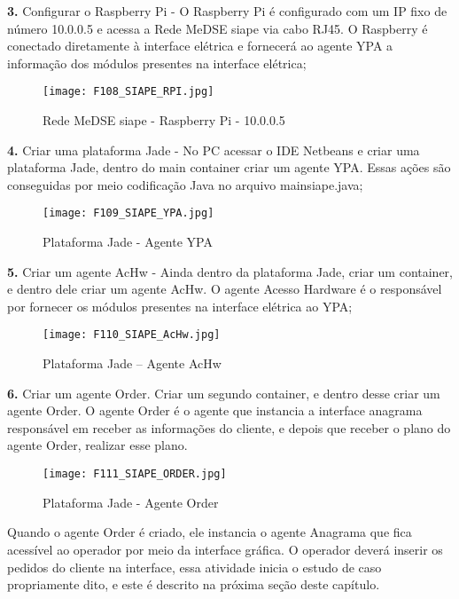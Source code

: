 		\textbf{3.} Configurar o Raspberry Pi -
			O Raspberry Pi é configurado com um IP fixo de número 10.0.0.5 e acessa a Rede MeDSE siape via cabo RJ45. O Raspberry é conectado diretamente à interface elétrica e fornecerá ao agente YPA a informação dos módulos presentes na interface  elétrica;
			
			
				\begin{figure}[!h]
					\centering
					\texttt{[image: F108\_SIAPE\_RPI.jpg]} 
					\caption{Rede MeDSE siape - Raspberry Pi - 10.0.0.5}
					\label{F108}
				\end{figure}
			
			
		\textbf{4.} Criar uma plataforma Jade -
			No PC acessar o IDE Netbeans e criar uma plataforma Jade, dentro do main container criar um agente YPA. Essas ações são conseguidas por meio codificação Java no arquivo mainsiape.java;
			
				\begin{figure}[!h]
					\centering
					\texttt{[image: F109\_SIAPE\_YPA.jpg]} 
					\caption{Plataforma Jade - Agente YPA}
					\label{F109}
				\end{figure}
			
			
	\textbf{5.} Criar um agente AcHw -
			Ainda dentro da plataforma Jade, criar um container, e dentro dele criar um agente AcHw. O agente Acesso Hardware é o responsável por fornecer os módulos presentes na interface elétrica ao YPA; 
			
				\begin{figure}[!h]
					\centering
					\texttt{[image: F110\_SIAPE\_AcHw.jpg]} 
					\caption{Plataforma Jade -- Agente AcHw}
					\label{F110}
				\end{figure}
			
		\textbf{6.} Criar um agente Order.
			Criar um segundo container, e dentro desse criar um agente Order. O agente Order é o agente que instancia a interface anagrama responsável em receber as informações do cliente, e depois que receber o plano do agente Order, realizar esse plano.
			
				\begin{figure}[!h]
					\centering
					\texttt{[image: F111\_SIAPE\_ORDER.jpg]} 
					\caption{Plataforma Jade - Agente Order}
					\label{F111}
				\end{figure}
		
		Quando o agente Order é criado, ele instancia o agente Anagrama que fica acessível ao operador por meio da interface gráfica. O operador deverá inserir os pedidos do cliente na interface, essa atividade inicia o estudo de caso propriamente dito, e este é descrito na próxima seção deste capítulo.
		
